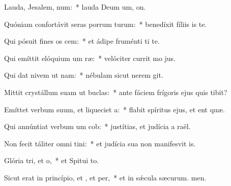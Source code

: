 \item Lauda, Jesalem, num:~* lauda Deum um, on.
\item Quóniam confortávit seras porrum turum:~* benedíxit fíliis is  te.
\item Qui pósuit fines os cem:~* et ádipe fruménti ti te.
\item Qui emíttit elóquium um ræ:~* velóciter currit mo jus.
\item Qui dat nivem ut nam:~* nébulam sicut nerem git.
\item Mittit crystállum suam ut buclas:~* ante fáciem frígoris ejus quis tibit?
\item Emíttet verbum suum, et liqueciet a:~* flabit spíritus ejus, et ent quæ.
\item Qui annúntiat verbum um cob:~* justítias, et judícia a raël.
\item Non fecit táliter omni tini:~* et judícia sua non manifesvit is.
\item Glória tri, et o,~* et Spitui to.
\item Sicut erat in princípio, et , et per,~* et in sǽcula sæcurum. men.
